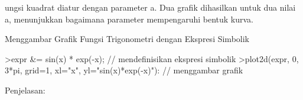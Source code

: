 \documentclass{article}
\begin{document}
\begin{eulernotebook}
\begin{eulercomment}
\begin{eulercomment}
\begin{eulercomment}
\begin{eulercomment}
\begin{eulercomment}
\begin{eulercomment}
\begin{eulercomment}
\begin{eulercomment}
\begin{eulercomment}
\begin{eulercomment}
\begin{eulercomment}
ungsi kuadrat diatur dengan parameter a. Dua grafik dihasilkan untuk
dua nilai a, menunjukkan bagaimana parameter mempengaruhi bentuk
kurva.

\end{eulercomment}
\eulersubheading{}
\begin{eulercomment}
Menggambar Grafik Fungsi Trigonometri dengan Ekspresi Simbolik

\end{eulercomment}
\begin{eulerprompt}
>expr &= sin(x) * exp(-x); // mendefinisikan ekspresi simbolik
>plot2d(expr, 0, 3*pi, grid=1, xl="x", yl="sin(x)*exp(-x)"): // menggambar grafik
\end{eulerprompt}
\begin{eulercomment}
Penjelasan:


\end{eulercomment}
\end{eulercomment}
\end{eulercomment}
\end{eulercomment}
\end{eulercomment}
\end{eulercomment}
\end{eulercomment}
\end{eulercomment}
\end{eulercomment}
\end{eulercomment}
\end{eulercomment}
\end{eulernotebook}
\end{document}

